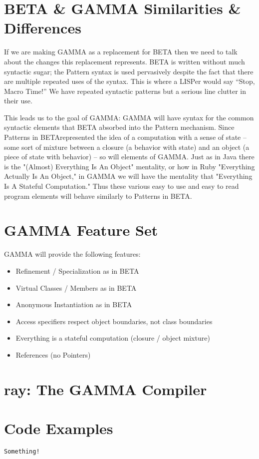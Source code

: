 \documentclass[10pt]{article}
\newcommand{\Lang}{GAMMA}
\newcommand{\Compiler}{ray}
\newcommand{\OLang}{BETA}
\begin{document}
\section*{\OLang{} \& \Lang{} Similarities \& Differences}
If we are making \Lang{} as a replacement for \OLang{} then we need to talk
about the changes this replacement represents. \OLang{} is written without
much syntactic sugar; the Pattern syntax is used pervasively despite the
fact that there are multiple repeated uses of the syntax. This is where a
LISPer would say ``Stop, Macro Time!'' We have repeated syntactic patterns
but a serious line clutter in their use.

This leads us to the goal of \Lang{}: \Lang{} will have syntax for the common
syntactic elements that \OLang{} absorbed into the Pattern mechanism. Since
Patterns in \OLang represented the idea of a computation with a sense of state
-- some sort of mixture between a closure (a behavior with state) and an object
(a piece of state with behavior) -- so will elements of \Lang{}. Just as in
Java there is the "(Almost) Everything Is An Object" mentality, or how in Ruby
"Everything Actually Is An Object," in \Lang{} we will have the mentality that
"Everything Is A Stateful Computation." Thus these various easy to use and
easy to read program elements will behave similarly to Patterns in \OLang{}.

\section*{\Lang{} Feature Set}

\Lang{} will provide the following features:

\begin{itemize}
\item Refinement / Specialization as in \OLang{}
\item Virtual Classes / Members as in \OLang{}
\item Anonymous Instantiation as in \OLang{}
\item Access specifiers respect object boundaries, not class boundaries
\item Everything is a stateful computation (closure / object mixture)
\item References (no Pointers)
\end{itemize}

\section*{\Compiler{}: The \Lang{} Compiler}

\section*{Code Examples}

\begin{lstlisting}[label=The Parent-Child Inheritance,caption=Some Code]
Something!
\end{lstlisting}
\end{document}
